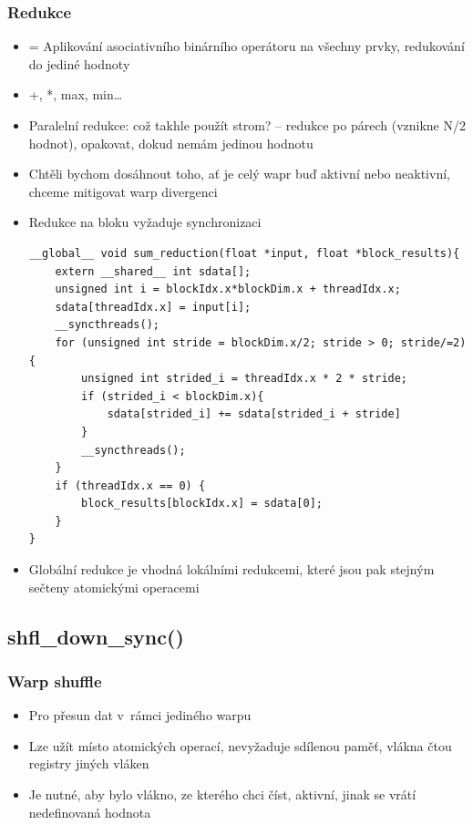 \subsubsection{Redukce}
\begin{itemize}
    \item = Aplikování asociativního binárního operátoru na všechny prvky, redukování do jediné hodnoty
    \item +, *, max, min\dots
    \item Paralelní redukce: což takhle použít strom? -- redukce po párech (vznikne N/2 hodnot), opakovat, dokud nemám jedinou hodnotu
    \item Chtěli bychom dosáhnout toho, ať je celý wapr buď aktivní nebo neaktivní, chceme mitigovat warp divergenci
    \item Redukce na bloku vyžaduje synchronizaci
    \begin{verbatim}
__global__ void sum_reduction(float *input, float *block_results){
    extern __shared__ int sdata[];
    unsigned int i = blockIdx.x*blockDim.x + threadIdx.x;
    sdata[threadIdx.x] = input[i];
    __syncthreads();
    for (unsigned int stride = blockDim.x/2; stride > 0; stride/=2){
        unsigned int strided_i = threadIdx.x * 2 * stride;
        if (strided_i < blockDim.x){
            sdata[strided_i] += sdata[strided_i + stride]
        }
        __syncthreads();
    }
    if (threadIdx.x == 0) {
        block_results[blockIdx.x] = sdata[0];
    }
}
    \end{verbatim}
    \item Globální redukce je vhodná lokálními redukcemi, které jsou pak stejným sečteny atomickými operacemi
\end{itemize}

\subsection{shfl\_down\_sync()}
\subsubsection{Warp shuffle}
\begin{itemize}
    \item Pro přesun dat v~rámci jediného warpu
    \item Lze užít místo atomických operací, nevyžaduje sdílenou paměť, vlákna čtou registry jiných vláken
    \item Je nutné, aby bylo vlákno, ze kterého chci číst, aktivní, jinak se vrátí nedefinovaná hodnota
\end{itemize}
